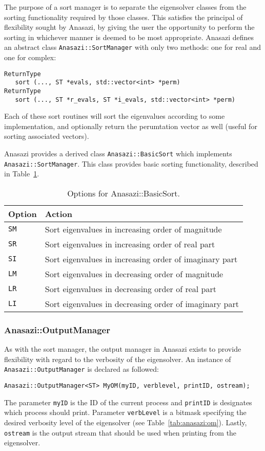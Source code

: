 The purpose of a sort manager is to separate the eigensolver classes from the
sorting functionality required by those classes. This satisfies the principal of
flexibility sought by Anasazi, by giving the user the opportunity to perform the
sorting in whichever manner is deemed to be most appropriate. Anasazi defines
an abstract class \verb!Anasazi::SortManager! with only two methods: one for
real and one for complex:
\begin{verbatim}
ReturnType  
   sort (..., ST *evals, std::vector<int> *perm) 
ReturnType 
   sort (..., ST *r_evals, ST *i_evals, std::vector<int> *perm)
\end{verbatim}
Each of these sort routines will sort the eigenvalues according to some
implementation, and optionally return the perumtation vector as well (useful for
sorting associated vectors).

Anasazi provides a derived class \verb!Anasazi::BasicSort! which implements
\verb!Anasazi::SortManager!. This class provides basic sorting functionality,
described in Table~\ref{tab:anasazi:sm}.

\begin{table}
\begin{center}
\begin{tabular}{| p{2cm} l |}
\hline
Option & Action \\
\hline
{\tt SM} & Sort eigenvalues in increasing order of magnitude \\
{\tt SR} & Sort eigenvalues in increasing order of real part \\
{\tt SI} & Sort eigenvalues in increasing order of imaginary part \\
{\tt LM} & Sort eigenvalues in decreasing order of magnitude \\
{\tt LR} & Sort eigenvalues in decreasing order of real part \\
{\tt LI} & Sort eigenvalues in decreasing order of imaginary part \\
\hline
\end{tabular}
\caption{Options for Anasazi::BasicSort.}
\label{tab:anasazi:sm}
\end{center}
\end{table}


\subsubsection{Anasazi::OutputManager}
\label{sec:anasazi:om}

As with the sort manager, the output manager in Anasazi exists to provide
flexibility with regard to the verbosity of the eigensolver. An instance of
\verb!Anasazi::OutputManager! is declared as followed:
\begin{verbatim}
Anasazi::OutputManager<ST> MyOM(myID, verblevel, printID, ostream);
\end{verbatim}
The parameter \verb!myID! is the ID of the current process and \verb!printID! is
designates which process should print. Parameter \verb!verbLevel! is a bitmask
specifying the desired verbosity level of the eigensolver (see
Table~\ref{tab:anasazi:om}). Lastly, \verb!ostream! is the output stream that
should be used when printing from the eigensolver.

